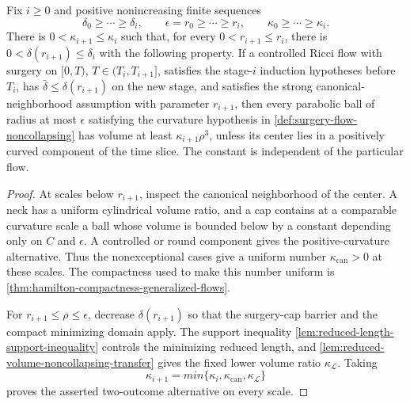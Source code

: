 \begin{theorem}
\label{thm:conditional-noncollapsing-extension}
\notready
Fix $i\ge0$ and positive nonincreasing finite sequences
\[
 \delta_0\ge\cdots\ge\delta_i,
 \qquad \epsilon=r_0\ge\cdots\ge r_i,
 \qquad \kappa_0\ge\cdots\ge\kappa_i.
\]
There is $0<\kappa_{i+1}\le\kappa_i$ such that, for every
$0<r_{i+1}\le r_i$, there is
$0<\delta(r_{i+1})\le\delta_i$ with the following property.  If a
controlled Ricci flow with surgery on $[0,T)$,
$T\in(T_i,T_{i+1}]$, satisfies the stage-$i$ induction hypotheses before
$T_i$, has $\bar\delta\le\delta(r_{i+1})$ on the new stage, and satisfies
the strong canonical-neighborhood assumption with parameter $r_{i+1}$,
then every parabolic ball of radius at most $\epsilon$ satisfying the
curvature hypothesis in
\ref{def:surgery-flow-noncollapsing} has volume at least
$\kappa_{i+1}\rho^3$, unless its center lies in a positively curved component
of the time slice.  The constant is independent of the particular flow.
\end{theorem}

\begin{proof}
At scales below $r_{i+1}$, inspect the canonical neighborhood of the center.
A neck has a uniform cylindrical volume ratio, and a cap contains at a
comparable curvature scale a ball whose volume is bounded below by a constant
depending only on $C$ and $\epsilon$.  A controlled or round component gives
the positive-curvature alternative.  Thus the nonexceptional cases give a
uniform number $\kappa_{\mathrm{can}}>0$ at these scales.  The compactness
used to make this number uniform is
\ref{thm:hamilton-compactness-generalized-flows}.

For $r_{i+1}\le\rho\le\epsilon$, decrease
$\delta(r_{i+1})$ so that the surgery-cap barrier and the compact minimizing
domain apply.  The support inequality
\ref{lem:reduced-length-support-inequality} controls the minimizing reduced
length, and \ref{lem:reduced-volume-noncollapsing-transfer} gives the fixed
lower volume ratio $\kappa_{\mathcal L}$.  Taking
\[
 \kappa_{i+1}=min\{\kappa_i,\kappa_{\mathrm{can}},
                         \kappa_{\mathcal L}\}
\]
proves the asserted two-outcome alternative on every scale.
\end{proof}

